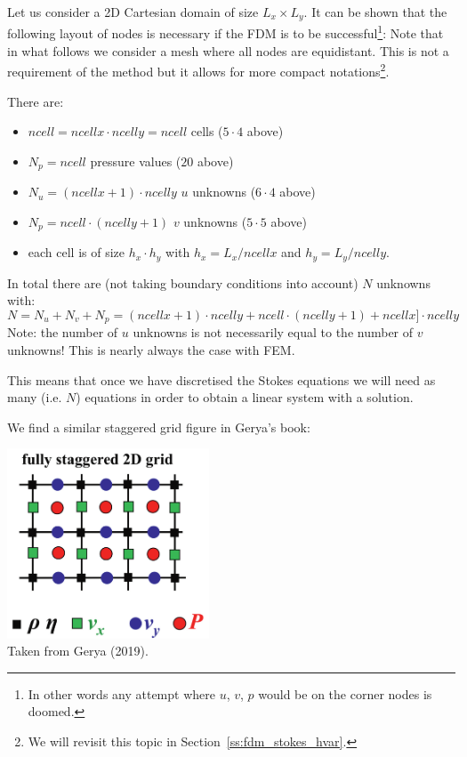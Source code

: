 Let us consider a 2D Cartesian domain of size $L_x \times L_y$.
It can be shown that the following layout of nodes is necessary 
if the FDM is to be successful\footnote{In other words
any attempt where $u$, $v$, $p$ would be on the corner nodes is doomed.}:
Note that in what follows we consider a mesh where all nodes are equidistant.
This is not a requirement of the method but it allows for more compact 
notations\footnote{We will revisit this topic in Section~\ref{ss:fdm_stokes_hvar}.}. 




There are:
\begin{itemize}
\item ${ncell}={ ncellx}\cdot { ncelly}={ ncell}$ cells ($5\cdot 4$ above)
\item ${N_p}={ ncell}$ pressure values ($20$ above)
\item ${N_u}={ (ncellx+1)}\cdot { ncelly}$ $u$ unknowns ($6\cdot 4$ above) 
\item ${N_p}={ ncell}\cdot { (ncelly+1)}$ $v$ unknowns ($5\cdot 5$ above) 
\item each cell is of size $h_x \cdot h_y$ 
with $h_x=L_x/{ ncellx}$ and $h_y=L_y/{ ncelly}$.
\end{itemize}
In total there are (not taking boundary conditions into account)
$N$ unknowns with:
\[
N=N_u+N_v+N_p
= { (ncellx+1)}\cdot{ ncelly}
+ { ncell}\cdot{ (ncelly+1)}
+ { ncellx}]\cdot{ ncelly} 
\]
Note: the number of $u$ unknowns is not necessarily equal to the number of $v$
unknowns! This is nearly always the case with FEM. 

This means that once we have discretised the Stokes equations we will need
as many (i.e. $N$) equations in order to obtain a linear system with a solution.

We find a similar staggered grid figure in Gerya's book:

\begin{center}
\includegraphics[width=6cm]{images/fdm/gerya_A}\\
{\captionfont Taken from Gerya (2019).}
\end{center}

